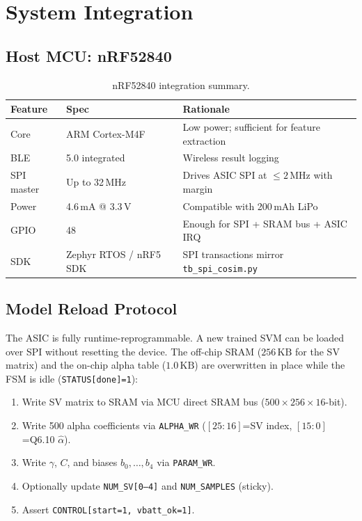 \documentclass[11pt]{article}
\begin{document}
\section{System Integration}

\subsection{Host MCU: nRF52840}

\begin{table}[H]
  \centering
  \caption{nRF52840 integration summary.}
  \label{tab:mcu}
  \small
  \begin{tabular}{lll}
    \toprule
    Feature & Spec & Rationale \\
    \midrule
    Core & ARM Cortex-M4F & Low power; sufficient for feature extraction \\
    BLE  & 5.0 integrated & Wireless result logging \\
    SPI master & Up to 32\,MHz & Drives ASIC SPI at $\le 2\,\mathrm{MHz}$ with margin \\
    Power & 4.6\,mA @ 3.3\,V & Compatible with 200\,mAh LiPo \\
    GPIO & 48 & Enough for SPI + SRAM bus + ASIC IRQ \\
    SDK  & Zephyr RTOS / nRF5 SDK & SPI transactions mirror \texttt{tb\_spi\_cosim.py} \\
    \bottomrule
  \end{tabular}
\end{table}

\subsection{Model Reload Protocol}

The ASIC is fully runtime-reprogrammable.  A new trained SVM can be loaded over
SPI without resetting the device.  The off-chip SRAM ($256\,\mathrm{KB}$ for
the SV matrix) and the on-chip alpha table ($1.0\,\mathrm{KB}$) are overwritten
in place while the FSM is idle (\texttt{STATUS[done]=1}):

\begin{enumerate}[noitemsep]
  \item Write SV matrix to SRAM via MCU direct SRAM bus ($500\times256\times16$-bit).
  \item Write 500 alpha coefficients via \texttt{ALPHA\_WR} ($[25:16]$=SV index, $[15:0]$=Q6.10 $\hat\alpha$).
  \item Write $\gamma$, $C$, and biases $b_0,\dots,b_4$ via \texttt{PARAM\_WR}.
  \item Optionally update \texttt{NUM\_SV[0--4]} and \texttt{NUM\_SAMPLES} (sticky).
  \item Assert \texttt{CONTROL[start=1, vbatt\_ok=1]}.
\end{enumerate}
\end{document}
